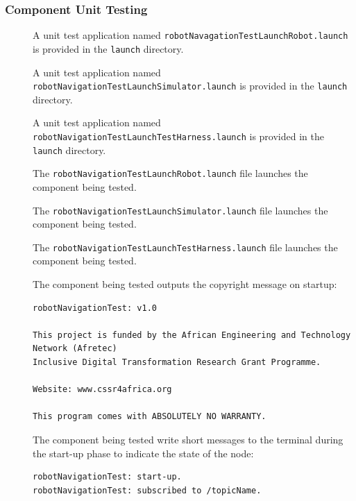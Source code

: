 \documentclass{CSSRforAfrica}
\newcommand{\checkboxChecked}{\fbox{\ding{51}}} %
\newcommand{\checkboxDashed}{\fbox{--}}         %
\begin{document}
\subsubsection{Component Unit Testing}

\begin{description}

\item[\checkboxChecked] A unit test application named {\small \verb+robotNavagationTestLaunchRobot.launch+} is provided in the {\small \verb+launch+} directory. 

\item[\checkboxDashed] A unit test application named {\small \verb+robotNavigationTestLaunchSimulator.launch+} is provided in the {\small \verb+launch+} directory.

\item[\checkboxChecked] A unit test application named {\small \verb+robotNavigationTestLaunchTestHarness.launch+} is provided in the {\small \verb+launch+} directory.

\item[\checkboxChecked] The {\small \verb+robotNavigationTestLaunchRobot.launch+} file  launches the component being tested.

\item[\checkboxDashed] The {\small \verb+robotNavigationTestLaunchSimulator.launch+} file  launches the component being tested.

\item[\checkboxChecked] The {\small \verb+robotNavigationTestLaunchTestHarness.launch+} file  launches the component being tested.

\item[\checkboxChecked] The component being tested outputs the copyright message on startup:  \\ 
{\scriptsize
\begin{verbatim}
robotNavigationTest: v1.0

This project is funded by the African Engineering and Technology Network (Afretec) 
Inclusive Digital Transformation Research Grant Programme. 

Website: www.cssr4africa.org

This program comes with ABSOLUTELY NO WARRANTY.
\end{verbatim}
}

\item[\checkboxChecked] The component being tested write short messages to the terminal  during the start-up phase to indicate the state of the node:
{\small
\begin{verbatim}
robotNavigationTest: start-up.
robotNavigationTest: subscribed to /topicName.
\end{verbatim}
} 


\end{description}
\end{document}

